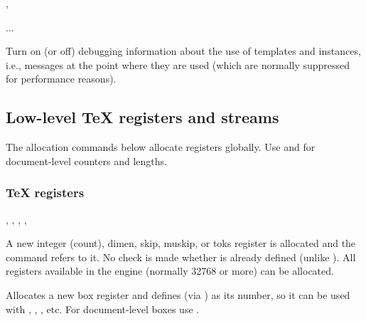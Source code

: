 \documentclass{l3in2edoc}
\begin{document}
\begin{function}[user]
  {
    \DebugTemplatesOn,
    \DebugTemplatesOff
  }
  \begin{syntax}
     ... 
  \end{syntax}
  Turn on (or off) debugging information about the use of templates
  and instances, i.e., messages at the point where they are used
  (which are normally suppressed for performance reasons).
\end{function}







\subsection{Low-level \TeX{} registers and streams}

The allocation commands below allocate registers globally. Use
 and  for document-level counters and
lengths.

\subsubsection{\TeX{} registers}

\begin{function}[]
  {
    \newcount,
    \newdimen,
    \newskip,
    \newmuskip,
    \newtoks
  }
  \begin{syntax}
     
  \end{syntax}
  A new integer (count), dimen, skip, muskip, or toks register is
  allocated and the command  refers to it. No check is made
  whether  is already defined (unlike ). All
  registers available in the engine (normally 32768 or more) can be
  allocated.
\end{function}


\begin{function}[]
  {
    \newbox
  }
  \begin{syntax}
     
  \end{syntax}
  Allocates a new box register and defines  (via
  ) as its number, so it can be used with ,
  , , etc. For document-level boxes use .
\end{function}
\end{document}
